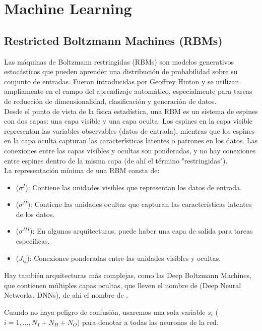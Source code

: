 \chapter{Machine Learning}

\section{Restricted Boltzmann Machines  (RBMs)}
Las máquinas de Boltzmann restringidas (RBMs) son modelos generativos estocásticos que pueden aprender una distribución de probabilidad sobre su conjunto de entradas. Fueron introducidas por Geoffrey Hinton y se utilizan ampliamente en el campo del aprendizaje automático, especialmente para tareas de reducción de dimensionalidad, clasificación y generación de datos. \\
\noindent
Desde el punto de vista de la física estadística, una RBM es un sistema de espines con dos capas: una capa visible y una capa oculta. Los espines en la capa visible representan las variables observables (datos de entrada), mientras que los espines en la capa oculta capturan las características latentes o patrones en los datos. Las conexiones entre las capas visibles y ocultas son ponderadas, y no hay conexiones entre espines dentro de la misma capa (de ahí el término "restringidas"). \\

\noindent
La representación mínima de una RBM consta de:
\begin{itemize}
    \item {} ($\sigma^I$): Contiene las unidades visibles que representan los datos de entrada.
    \item {} ($\sigma^{II}$): Contiene las unidades ocultas que capturan las características latentes de los datos.
    \item {} ($\sigma^{III}$): En algunas arquitecturas, puede haber una capa de salida para tareas específicas.
    \item {} ($J_{ij}$): Conexiones ponderadas entre las unidades visibles y ocultas.
\end{itemize}
Hay también arquitecturas más complejas, como las Deep Boltzmann Machines, que contienen múltiples capas ocultas, que lleven el nombre de  (Deep Neural Networks, DNNs), de ahí el nombre de . \\

\begin{notacion}
    Cuando no haya peligro de confusión, usaremos una sola variable $s_i$ ($i = 1, \ldots, N_I + N_H + N_O$) para denotar a todas las neuronas de la red. \\
\end{notacion}

